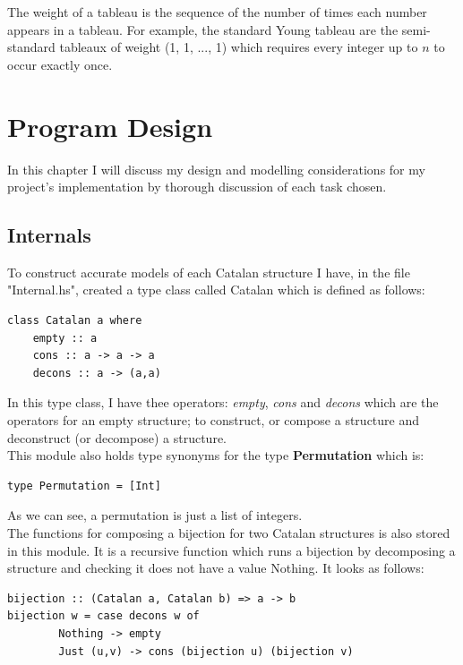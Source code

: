 \documentclass[12pt]{article}
\begin{document}
The weight of a tableau is the sequence of the number of times each number appears in a tableau. For example, the standard Young tableau are the semi-standard tableaux of weight (1, 1, ..., 1) which requires every integer up to $n$ to occur exactly once.


\section{Program Design}
In this chapter I will discuss my design and modelling considerations for my project's implementation by thorough discussion of each task chosen.

\subsection{Internals}
To construct accurate models of each Catalan structure I have, in the file "Internal.hs", created a type class called Catalan which is defined as follows:
\begin{lstlisting}
class Catalan a where
	empty :: a
	cons :: a -> a -> a
	decons :: a -> (a,a)
\end{lstlisting}
In this type class, I have thee operators: {\it empty}, {\it cons} and {\it decons} which are the operators for an empty structure; to construct, or compose a structure and deconstruct (or decompose) a structure.\\
This module also holds type synonyms for the type {\bf Permutation} which is:
\begin{lstlisting}
type Permutation = [Int]
\end{lstlisting}
As we can see, a permutation is just a list of integers.\\
The functions for composing a bijection for two Catalan structures is also stored in this module. It is a recursive function which runs a bijection by decomposing a structure and checking it does not have a value Nothing. It looks as follows:
\begin{lstlisting}
bijection :: (Catalan a, Catalan b) => a -> b
bijection w = case decons w of
		Nothing -> empty
		Just (u,v) -> cons (bijection u) (bijection v)
\end{lstlisting}
\end{document}
